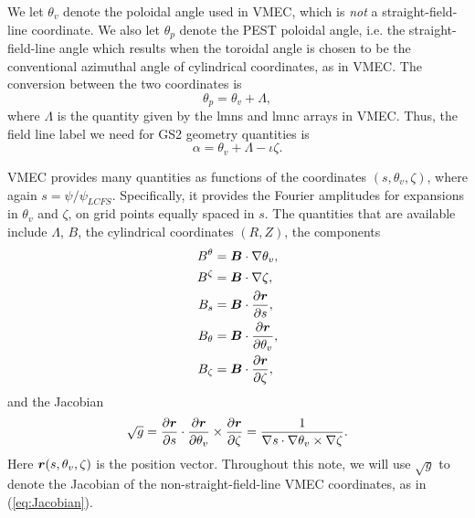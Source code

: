 \documentclass[11pt,letter]{article}
\newcommand{\vect}[1]{\mbox{\boldmath $#1$}}
\begin{document}
We let $\theta_v$ denote the poloidal angle used in VMEC, which is \emph{not} a straight-field-line coordinate.
We also let $\theta_p$ denote the PEST poloidal angle, i.e. the straight-field-line angle which results when
the toroidal angle is chosen to be the conventional azimuthal angle of cylindrical coordinates, as in VMEC.
The conversion between the two coordinates is
\begin{equation}
\theta_p = \theta_v + \Lambda,
\end{equation}
where $\Lambda$ is the quantity given by the {\ttfamily lmns} and {\ttfamily lmnc} arrays in VMEC.
Thus, the field line label we need for GS2 geometry quantities is
\begin{equation}
\alpha = \theta_v + \Lambda - \iota \zeta.
\label{eq:alpha_vmec}
\end{equation}

VMEC provides many quantities as functions of the coordinates $(s, \theta_v, \zeta)$,
where again $s = \psi / \psi_{LCFS}$.
Specifically, it provides the Fourier amplitudes for expansions in $\theta_v$ and $\zeta$,
on grid points equally spaced in $s$.
The quantities that are available include
$\Lambda$, $B$, the cylindrical coordinates $(R,Z)$, the components
\begin{align}
B^\theta &= \vect{B}\cdot\nabla\theta_v, \nonumber \\
B^\zeta &= \vect{B}\cdot\nabla\zeta, \nonumber \\
B_s &= \vect{B}\cdot\frac{\partial\vect{r}}{\partial s}, \nonumber \\
B_\theta &= \vect{B}\cdot\frac{\partial\vect{r}}{\partial \theta_v}, \nonumber \\
B_\zeta &= \vect{B}\cdot\frac{\partial\vect{r}}{\partial \zeta}, \nonumber
\end{align}
and the Jacobian
\begin{equation}
\sqrt{g} = \frac{\partial \vect{r}}{\partial s} \cdot \frac{\partial \vect{r}}{\partial\theta_v} \times \frac{\partial\vect{r}}{\partial\zeta}
= \frac{1}{\nabla s \cdot \nabla \theta_v \times\nabla\zeta}.
\label{eq:Jacobian}
\end{equation}
Here $\vect{r}(s,\theta_v,\zeta)$ is the position vector.
Throughout this note, we will use $\sqrt{g}$ to denote the Jacobian of the non-straight-field-line
VMEC coordinates, as in (\ref{eq:Jacobian}).

\end{document}

